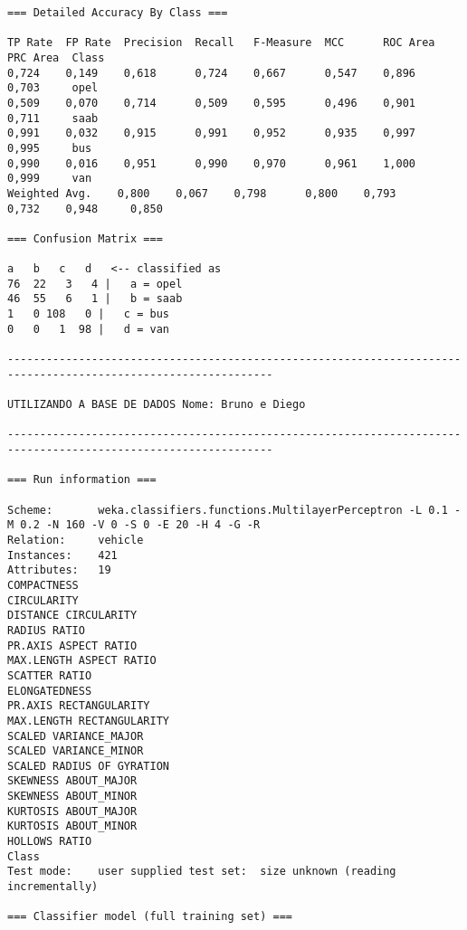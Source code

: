 \documentclass[
	article,			%
	11pt,				%
	oneside,			%
	a4paper,			%
	english,			%
	brazil,				%
	sumario=tradicional
	]{abntex2}
\begin{document}
\begin{lstlisting}
=== Detailed Accuracy By Class ===

TP Rate  FP Rate  Precision  Recall   F-Measure  MCC      ROC Area  PRC Area  Class
0,724    0,149    0,618      0,724    0,667      0,547    0,896     0,703     opel
0,509    0,070    0,714      0,509    0,595      0,496    0,901     0,711     saab
0,991    0,032    0,915      0,991    0,952      0,935    0,997     0,995     bus
0,990    0,016    0,951      0,990    0,970      0,961    1,000     0,999     van
Weighted Avg.    0,800    0,067    0,798      0,800    0,793      0,732    0,948     0,850     

=== Confusion Matrix ===

a   b   c   d   <-- classified as
76  22   3   4 |   a = opel
46  55   6   1 |   b = saab
1   0 108   0 |   c = bus
0   0   1  98 |   d = van

---------------------------------------------------------------------------------------------------------------

UTILIZANDO A BASE DE DADOS Nome: Bruno e Diego

---------------------------------------------------------------------------------------------------------------

=== Run information ===

Scheme:       weka.classifiers.functions.MultilayerPerceptron -L 0.1 -M 0.2 -N 160 -V 0 -S 0 -E 20 -H 4 -G -R
Relation:     vehicle
Instances:    421
Attributes:   19
COMPACTNESS
CIRCULARITY
DISTANCE CIRCULARITY
RADIUS RATIO
PR.AXIS ASPECT RATIO
MAX.LENGTH ASPECT RATIO
SCATTER RATIO
ELONGATEDNESS
PR.AXIS RECTANGULARITY
MAX.LENGTH RECTANGULARITY
SCALED VARIANCE_MAJOR
SCALED VARIANCE_MINOR
SCALED RADIUS OF GYRATION
SKEWNESS ABOUT_MAJOR
SKEWNESS ABOUT_MINOR
KURTOSIS ABOUT_MAJOR
KURTOSIS ABOUT_MINOR
HOLLOWS RATIO
Class
Test mode:    user supplied test set:  size unknown (reading incrementally)

=== Classifier model (full training set) ===


\end{lstlisting}
\end{document}
